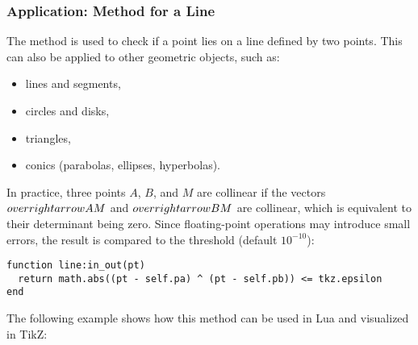 \subsubsection{Application:  Method for a Line}
\label{ssub:in_out_for_a_line}

The method  is used to check if a point lies on a line defined by two points. This can also be applied to other geometric objects, such as:

\begin{itemize}
  \item lines and segments,
  \item circles and disks,
  \item triangles,
  \item conics (parabolas, ellipses, hyperbolas).
\end{itemize}

In practice, three points \( A \), \( B \), and \( M \) are collinear if the vectors \( \\overrightarrow{AM} \) and \( \\overrightarrow{BM} \) are collinear, which is equivalent to their determinant being zero. Since floating-point operations may introduce small errors, the result is compared to the threshold  (default \( 10^{-10} \)):

\begin{mybox}
\begin{verbatim}
function line:in_out(pt)
  return math.abs((pt - self.pa) ^ (pt - self.pb)) <= tkz.epsilon
end
\end{verbatim}
\end{mybox}

The following example shows how this method can be used in Lua and visualized in TikZ:

\vspace{1em}

